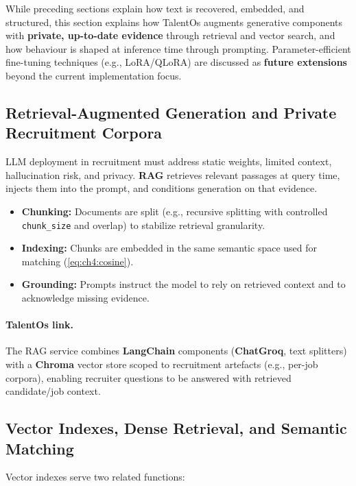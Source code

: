 While preceding sections explain how text is recovered, embedded, and structured, this section explains how TalentOs augments generative components with \textbf{private, up-to-date evidence} through retrieval and vector search, and how behaviour is shaped at inference time through prompting. Parameter-efficient fine-tuning techniques (e.g., LoRA/QLoRA) are discussed as \textbf{future extensions} beyond the current implementation focus.

\subsection{Retrieval-Augmented Generation and Private Recruitment Corpora}
\label{sec:ch4:rag}

LLM deployment in recruitment must address static weights, limited context, hallucination risk, and privacy. \textbf{RAG} retrieves relevant passages at query time, injects them into the prompt, and conditions generation on that evidence.

\begin{itemize}
    \item \textbf{Chunking:} Documents are split (e.g., recursive splitting with controlled \texttt{chunk\_size} and overlap) to stabilize retrieval granularity.
    \item \textbf{Indexing:} Chunks are embedded in the same semantic space used for matching (\autoref{eq:ch4:cosine}).
    \item \textbf{Grounding:} Prompts instruct the model to rely on retrieved context and to acknowledge missing evidence.
\end{itemize}

\paragraph{TalentOs link.}
The RAG service combines \textbf{LangChain} components (\textbf{ChatGroq}, text splitters) with a \textbf{Chroma} vector store scoped to recruitment artefacts (e.g., per-job corpora), enabling recruiter questions to be answered with retrieved candidate/job context.

\subsection{Vector Indexes, Dense Retrieval, and Semantic Matching}
\label{sec:ch4:vector_indexes}

Vector indexes serve two related functions:

